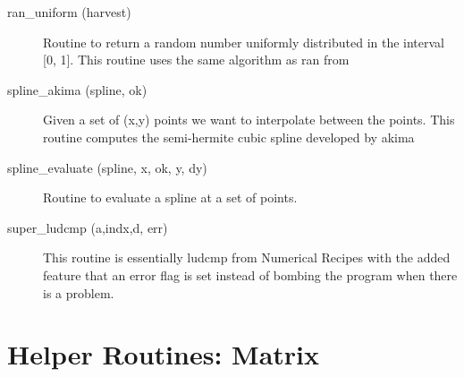 \begin{description}
\label{r:ran.uniform}
\item[ran_uniform (harvest)] \Newline 
Routine to return a random number uniformly distributed in the 
interval [0, 1]. This routine uses the same algorithm as ran from

\label{r:spline.akima}
\item[spline_akima (spline, ok)] \Newline 
Given a set of (x,y) points we want to interpolate between the points.
This routine computes the semi-hermite cubic spline developed by akima

\label{r:spline.evaluate}
\item[spline_evaluate (spline, x, ok, y, dy)] \Newline 
Routine to evaluate a spline at a set of points.

\label{r:super.ludcmp}
\item[super_ludcmp (a,indx,d, err)] \Newline 
This routine is essentially ludcmp from Numerical Recipes with the added feature
that an error flag is set instead of bombing the program when there is a problem.

\end{description}

\section{Helper Routines: Matrix}
\label{r:helper.matrix}

